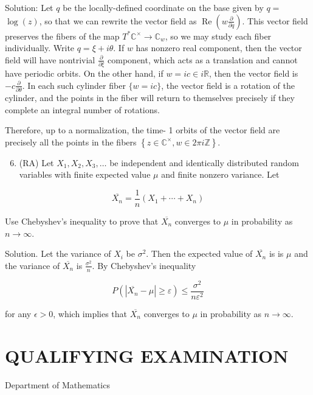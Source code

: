 \documentclass[10pt]{article}
\begin{document}
Solution: Let $q$ be the locally-defined coordinate on the base given by $q=$ $\log (z)$, so that we can rewrite the vector field as $\operatorname{Re}\left(w \frac{\partial}{\partial q}\right)$. This vector field preserves the fibers of the map $T^{*} \mathbb{C}^{\times} \rightarrow \mathbb{C}_{w}$, so we may study each fiber individually. Write $q=\xi+i \theta$. If $w$ has nonzero real component, then the vector field will have nontrivial $\frac{\partial}{\partial \xi}$ component, which acts as a translation and cannot have periodic orbits. On the other hand, if $w=i c \in i \mathbb{R}$, then the vector field is $-c \frac{\partial}{\partial \theta}$. In each such cylinder fiber $\{w=i c\}$, the vector field is a rotation of the cylinder, and the points in the fiber will return to themselves precisely if they complete an integral number of rotations.

Therefore, up to a normalization, the time- 1 orbits of the vector field are precisely all the points in the fibers $\left\{z \in \mathbb{C}^{\times}, w \in 2 \pi i \mathbb{Z}\right\}$.

\begin{enumerate}
  \setcounter{enumi}{5}
  \item (RA) Let $X_{1}, X_{2}, X_{3}, \ldots$ be independent and identically distributed random variables with finite expected value $\mu$ and finite nonzero variance. Let
\end{enumerate}

$$
\overline{X_{n}}=\frac{1}{n}\left(X_{1}+\cdots+X_{n}\right)
$$

Use Chebyshev's inequality to prove that $\overline{X_{n}}$ converges to $\mu$ in probability as $n \rightarrow \infty$.

Solution. Let the variance of $X_{i}$ be $\sigma^{2}$. Then the expected value of $\overline{X_{n}}$ is is $\mu$ and the variance of $\overline{X_{n}}$ is $\frac{\sigma^{2}}{n}$. By Chebyshev's inequality

$$
P\left(\left|\overline{X_{n}}-\mu\right| \geq \varepsilon\right) \leq \frac{\sigma^{2}}{n \varepsilon^{2}}
$$

for any $\epsilon>0$, which implies that $\overline{X_{n}}$ converges to $\mu$ in probability as $n \rightarrow \infty$.

\section*{QUALIFYING EXAMINATION }
Department of Mathematics
\end{document}
